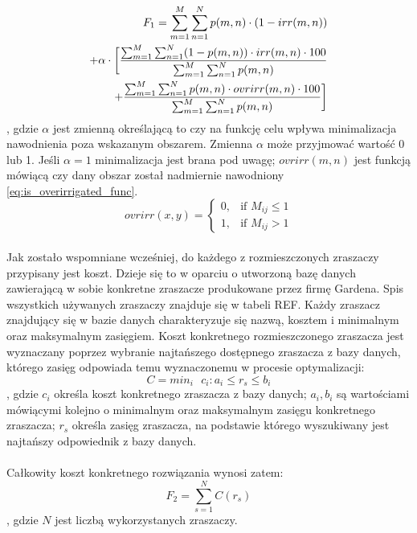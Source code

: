 \documentclass[twoside]{iisthesis}
\begin{document}
\begin{equation}
\begin{split}
	F_{1} = \sum_{m=1}^{M}\sum_{n=1}^{N} p(m,n) \cdot (1 - irr(m,n)) \\ + 
	\alpha \cdot \bigg{[}\dfrac{\sum_{m=1}^{M}\sum_{n=1}^{N} (1 - p(m,n)) \cdot irr(m,n) \cdot 100}{\sum_{m=1}^{M}\sum_{n=1}^{N} p(m,n)} \\ + \dfrac{\sum_{m=1}^{M}\sum_{n=1}^{N} p(m,n) \cdot ovrirr(m,n) \cdot 100}{\sum_{m=1}^{M}\sum_{n=1}^{N} p(m,n)}\bigg{]}
\end{split}
\end{equation}
, gdzie $\alpha$ jest zmienną określającą to czy na funkcję celu wpływa minimalizacja nawodnienia poza wskazanym obszarem. Zmienna $\alpha$ może przyjmować wartość 0 lub 1. Jeśli $\alpha=1$ minimalizacja jest brana pod uwagę; $ovrirr(m,n)$ jest funkcją mówiącą czy dany obszar został nadmiernie nawodniony \eqref{eq:is_overirrigated_func}.
\begin{equation}\label{eq:is_overirrigated_func}
	ovrirr(x,y) = \begin{cases}
				0,& \text{if } M_{ij} \leq 1 \\
				1,& \text{if } M_{ij} > 1
			   \end{cases}
\end{equation}
\\Jak zostało wspomniane wcześniej, do każdego z rozmieszczonych zraszaczy przypisany jest koszt. Dzieje się to w oparciu o utworzoną bazę danych zawierającą w sobie konkretne zraszacze produkowane przez firmę Gardena. Spis wszystkich używanych zraszaczy znajduje się w tabeli REF. Każdy zraszacz znajdujący się w bazie danych charakteryzuje się nazwą, kosztem i minimalnym oraz maksymalnym zasięgiem. Koszt konkretnego rozmieszczonego zraszacza jest wyznaczany poprzez wybranie najtańszego dostępnego zraszacza z bazy danych, którego zasięg odpowiada temu wyznaczonemu w procesie optymalizacji:
\begin{equation}
	C = min_{i}\text{ }c_{i} : a_{i} \leq r_{s} \leq b_{i}
\end{equation}
, gdzie $c_{i}$ określa koszt konkretnego zraszacza z bazy danych; $a_{i}, b_{i}$ są wartościami mówiącymi kolejno o minimalnym oraz maksymalnym zasięgu konkretnego zraszacza; $r_{s}$ określa zasięg zraszacza, na podstawie którego wyszukiwany jest najtańszy odpowiednik z bazy danych.\\\\
Całkowity koszt konkretnego rozwiązania wynosi zatem:
\begin{equation}
	F_{2} = \sum_{s=1}^{N} C(r_{s})
\end{equation}
, gdzie $N$ jest liczbą wykorzystanych zraszaczy.
\end{document}
